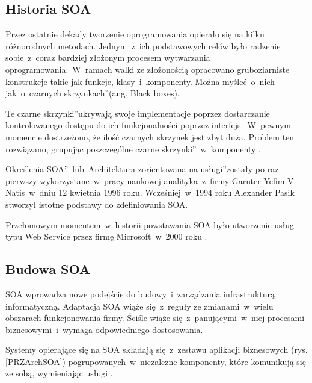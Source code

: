 \subsection{Historia SOA}
Przez ostatnie dekady tworzenie oprogramowania opierało się na kilku różnorodnych metodach. Jednym~z~ich podstawowych celów było radzenie sobie~z~coraz bardziej złożonym procesem wytwarzania oprogramowania.~W~ramach walki ze złożonością opracowano gruboziarniste konstrukcje takie jak funkcje, klasy~i~komponenty. Można myśleć~o~nich jak~o~\quotedblbase czarnych skrzynkach\textquotedblright (ang. Black boxes). 

Te \quotedblbase czarne skrzynki\textquotedblright ukrywają swoje implementacje poprzez dostarczanie kontrolowanego dostępu do ich funkcjonalności poprzez interfejs.~W~pewnym momencie dostrzeżono, że ilość czarnych skrzynek jest zbyt duża. Problem ten rozwiązano, grupując poszczególne \quotedblbase czarne skrzynki\textquotedblright~w~komponenty \cite{SteveMichSOA}. 

Określenia \quotedblbase SOA\textquotedblright ~lub~\quotedblbase Architektura zorientowana na usługi\textquotedblright zostały po raz pierwszy wykorzystane~w~pracy naukowej analityka~z~firmy Garnter Yefim V. Natis~w~dniu 12 kwietnia 1996 roku. Wcześniej~w~1994 roku Alexander Pasik stworzył istotne podstawy do zdefiniowania SOA. 

Przełomowym momentem~w~historii powstawania SOA było utworzenie usług typu Web Service przez firmę Microsoft~w~2000 roku \cite{JosSOAHist}.

\subsection{Budowa SOA}
SOA wprowadza nowe podejście do budowy~i~zarządzania infrastrukturą informatyczną. Adaptacja SOA wiąże się~z~reguły ze zmianami~w~wielu obszarach funkcjonowania firmy. Ściśle wiąże się~z~panującymi~w~niej procesami biznesowymi~i~wymaga odpowiedniego dostosowania.

Systemy opierające się na SOA składają się~z~zestawu aplikacji biznesowych (rys. \ref{PRZArchSOA}) pogrupowanych~w~niezależne komponenty, które komunikują się ze sobą, wymieniając usługi \cite{SOAwJBBC}. 

